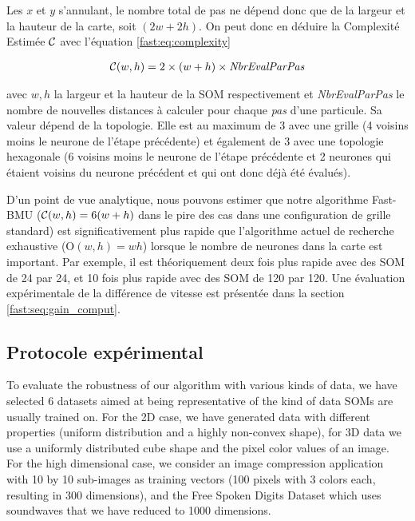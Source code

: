 	Les $x$ et $y$ s'annulant, le nombre total de pas ne dépend donc que de la largeur et la hauteur de la carte, soit $(2w + 2h)$. On peut donc en déduire la Complexité Estimée $\cal C$ avec l'équation \ref{fast:eq:complexity}

	\begin{align}\label{fast:eq:complexity}
    	{\cal C}(w, h) = 2 \times (w + h) \times \textit{NbrEvalParPas}
	\end{align}

	avec $w, h$ la largeur et la hauteur de la SOM respectivement et \textit{NbrEvalParPas} le nombre de nouvelles distances à calculer pour chaque \textit{pas} d'une particule. Sa valeur dépend de la topologie. Elle est au maximum de 3 avec une grille (4 voisins moins le neurone de l'étape précédente) et également de 3 avec une topologie hexagonale (6 voisins moins le neurone de l'étape précédente et 2 neurones qui étaient voisins du neurone précédent et qui ont donc déjà été évalués). 

	D'un point de vue analytique, nous pouvons estimer que notre algorithme Fast-BMU (${\cal C}(w,h)=6(w+h)$ dans le pire des cas dans une configuration de grille standard) est significativement plus rapide que l'algorithme actuel de recherche exhaustive (O$(w,h) = wh$) lorsque le nombre de neurones dans la carte est important. Par exemple, il est théoriquement deux fois plus rapide avec des SOM de 24 par 24, et 10 fois plus rapide avec des SOM de 120 par 120. Une évaluation expérimentale de la différence de vitesse est présentée dans la section \ref{fast:seq:gain_comput}.

	\subsection{Protocole expérimental}

	To evaluate the robustness of our algorithm with various kinds of data, we have selected 6 datasets aimed at being representative of the kind of data SOMs are usually trained on. For the 2D case, we have generated data with different properties (uniform distribution and a highly non-convex shape), for 3D data we use a uniformly distributed cube shape and the pixel color values of an image. For the high dimensional case, we consider an image compression application \cite{amerijckx2003image} with 10 by 10 sub-images as training vectors (100 pixels with 3 colors each, resulting in 300 dimensions), and the Free Spoken Digits Dataset \cite{zohar_jackson_2018_1342401} which uses soundwaves that we have reduced to 1000 dimensions.

